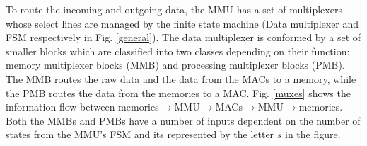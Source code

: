 \documentclass[conference,compsoc]{IEEEtran}
\begin{document}
To route the incoming and outgoing data, the MMU has a set of multiplexers whose
select lines are managed by the finite state machine (Data multiplexer and FSM respectively
in Fig. \ref{general}). The data multiplexer is conformed by a set of smaller
blocks which are classified into two classes depending on their function: memory
multiplexer blocks (MMB) and processing multiplexer blocks (PMB). The MMB routes
the raw data and the data from the MACs to a memory, while the PMB routes the
data from the memories to a MAC. Fig. \ref{muxes} shows the information flow
between
memories$\rightarrow$MMU$\rightarrow$MACs$\rightarrow$MMU$\rightarrow$memories.
Both the MMBs and PMBs have a number of inputs dependent on the number of states
from the MMU's FSM and its represented by the letter $s$ in the figure.

\begin{figure}[!t]
\centering
{}
\hfil %
\centering

\end{figure}
\end{document}
